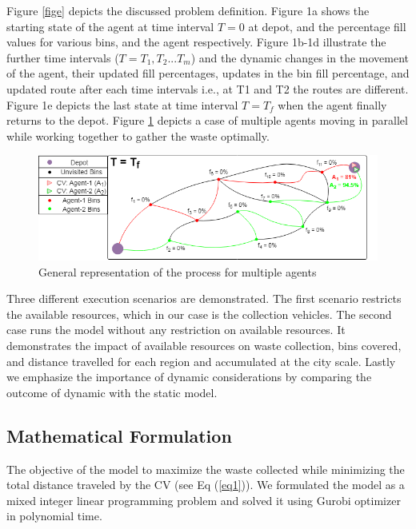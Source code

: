 \documentclass[12pt]{article}
\begin{document}
Figure \ref{fige} depicts the discussed problem definition. Figure 1a shows the starting state of the agent at time interval $T=0$ at depot, and the percentage fill values for various bins, and the agent respectively. Figure 1b-1d illustrate the further time intervals ($T=T_1,T_2...T_m$) and the dynamic changes in the movement of the agent, their updated fill percentages, updates in the bin fill percentage, and updated route after each time intervals i.e., at T1 and T2 the routes are different. Figure 1e depicts the last state at time interval $T=T_f$ when the agent finally returns to the depot. Figure \ref{fige2} depicts a case of multiple agents moving in parallel while working together to gather the waste optimally.  

\begin{figure}[H]
    \centering
    \includegraphics[scale=0.6]{ExplanationFigure2.png}
    \caption{General representation of the process for multiple agents}\label{fige2}
\end{figure}

Three different execution scenarios are demonstrated. The first scenario restricts the available resources, which in our case is the collection vehicles. The second case runs the model without any restriction on available resources. It demonstrates the impact of available resources on waste collection, bins covered, and distance travelled for each region and accumulated at the city scale. Lastly we emphasize the importance of dynamic considerations by comparing the outcome of dynamic with the static model.

\subsection {Mathematical Formulation}

The objective of the model to maximize the waste collected while minimizing the total distance traveled by the CV (see Eq (\ref{eq1})). We formulated the model as a mixed integer linear programming problem and solved it using Gurobi optimizer \cite{gurobi} in polynomial time.
\end{document}
